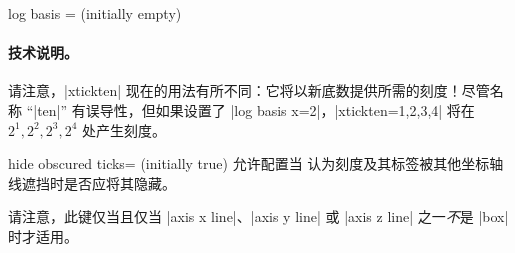 \begin{pgfplotsxykey}{log basis \x= (initially empty)}
    \paragraph{技术说明。}


    请注意，|xtickten| 现在的用法有所不同：它将以新底数提供所需的刻度！尽管名称 ``|ten|'' 有误导性，但如果设置了 |log basis x=2|，|xtickten={1,2,3,4}| 将在 $2^1,2^2,2^3,2^4$ 处产生刻度。
\end{pgfplotsxykey}

\begin{pgfplotsxykey}{hide obscured \x\space ticks= (initially true)}
    允许配置当 \PGFPlots{} 认为刻度及其标签被其他坐标轴线遮挡时是否应将其隐藏。
\begin{codeexample}[]
\end{codeexample}
\begin{codeexample}[]
\end{codeexample}
    请注意，此键仅当且仅当 |axis x line|、|axis y line| 或 |axis z line| 之一\emph{不}是 |box| 时才适用。
\end{pgfplotsxykey}
